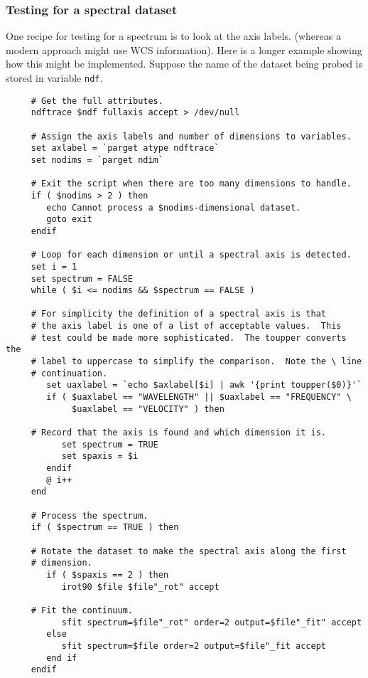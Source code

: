 \newpage
\subsubsection{Testing for a spectral
dataset\label{sc4_se_dataset_spectrum}}

One recipe for testing for a spectrum is to look at the axis labels.
(whereas a modern approach might use WCS information). Here is a
longer example showing how this might be implemented.
Suppose the name of the dataset being probed is stored in variable
{\tt ndf}.

\small
\begin{verbatim}
     # Get the full attributes.
     ndftrace $ndf fullaxis accept > /dev/null

     # Assign the axis labels and number of dimensions to variables.
     set axlabel = `parget atype ndftrace`
     set nodims = `parget ndim`
     
     # Exit the script when there are too many dimensions to handle.
     if ( $nodims > 2 ) then
        echo Cannot process a $nodims-dimensional dataset.
        goto exit
     endif

     # Loop for each dimension or until a spectral axis is detected.
     set i = 1
     set spectrum = FALSE
     while ( $i <= nodims && $spectrum == FALSE )

     # For simplicity the definition of a spectral axis is that
     # the axis label is one of a list of acceptable values.  This
     # test could be made more sophisticated.  The toupper converts the
     # label to uppercase to simplify the comparison.  Note the \ line
     # continuation.
        set uaxlabel = `echo $axlabel[$i] | awk '{print toupper($0)}'`
        if ( $uaxlabel == "WAVELENGTH" || $uaxlabel == "FREQUENCY" \
             $uaxlabel == "VELOCITY" ) then

     # Record that the axis is found and which dimension it is.
           set spectrum = TRUE
           set spaxis = $i
        endif
        @ i++
     end
     
     # Process the spectrum.
     if ( $spectrum == TRUE ) then

     # Rotate the dataset to make the spectral axis along the first
     # dimension.
        if ( $spaxis == 2 ) then
           irot90 $file $file"_rot" accept

     # Fit the continuum.
           sfit spectrum=$file"_rot" order=2 output=$file"_fit" accept
        else
           sfit spectrum=$file order=2 output=$file"_fit accept
        end if
     endif
\end{verbatim}
\normalsize

